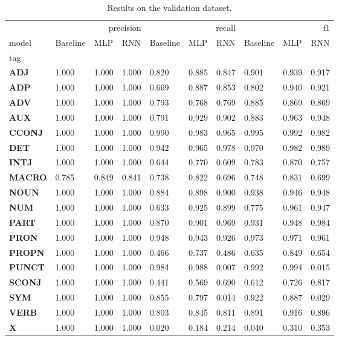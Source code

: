 \begin{table}
\caption{Results on the validation dataset.}
\label{tab::ex_2_valid}
\begin{tabular}{|l||l||l||l||l||l||l||l||l||l|}
\toprule
 & \multicolumn{3}{r}{precision} & \multicolumn{3}{r}{recall} & \multicolumn{3}{r}{f1} \\
model & Baseline & MLP & RNN & Baseline & MLP & RNN & Baseline & MLP & RNN \\
tag &  &  &  &  &  &  &  &  &  \\
\midrule
\textbf{ADJ} & 1.000 & 1.000 & 1.000 & 0.820 & 0.885 & 0.847 & 0.901 & 0.939 & 0.917 \\
\textbf{ADP} & 1.000 & 1.000 & 1.000 & 0.669 & 0.887 & 0.853 & 0.802 & 0.940 & 0.921 \\
\textbf{ADV} & 1.000 & 1.000 & 1.000 & 0.793 & 0.768 & 0.769 & 0.885 & 0.869 & 0.869 \\
\textbf{AUX} & 1.000 & 1.000 & 1.000 & 0.791 & 0.929 & 0.902 & 0.883 & 0.963 & 0.948 \\
\textbf{CCONJ} & 1.000 & 1.000 & 1.000 & 0.990 & 0.983 & 0.965 & 0.995 & 0.992 & 0.982 \\
\textbf{DET} & 1.000 & 1.000 & 1.000 & 0.942 & 0.965 & 0.978 & 0.970 & 0.982 & 0.989 \\
\textbf{INTJ} & 1.000 & 1.000 & 1.000 & 0.644 & 0.770 & 0.609 & 0.783 & 0.870 & 0.757 \\
\textbf{MACRO} & 0.785 & 0.849 & 0.841 & 0.738 & 0.822 & 0.696 & 0.748 & 0.831 & 0.699 \\
\textbf{NOUN} & 1.000 & 1.000 & 1.000 & 0.884 & 0.898 & 0.900 & 0.938 & 0.946 & 0.948 \\
\textbf{NUM} & 1.000 & 1.000 & 1.000 & 0.633 & 0.925 & 0.899 & 0.775 & 0.961 & 0.947 \\
\textbf{PART} & 1.000 & 1.000 & 1.000 & 0.870 & 0.901 & 0.969 & 0.931 & 0.948 & 0.984 \\
\textbf{PRON} & 1.000 & 1.000 & 1.000 & 0.948 & 0.943 & 0.926 & 0.973 & 0.971 & 0.961 \\
\textbf{PROPN} & 1.000 & 1.000 & 1.000 & 0.466 & 0.737 & 0.486 & 0.635 & 0.849 & 0.654 \\
\textbf{PUNCT} & 1.000 & 1.000 & 1.000 & 0.984 & 0.988 & 0.007 & 0.992 & 0.994 & 0.015 \\
\textbf{SCONJ} & 1.000 & 1.000 & 1.000 & 0.441 & 0.569 & 0.690 & 0.612 & 0.726 & 0.817 \\
\textbf{SYM} & 1.000 & 1.000 & 1.000 & 0.855 & 0.797 & 0.014 & 0.922 & 0.887 & 0.029 \\
\textbf{VERB} & 1.000 & 1.000 & 1.000 & 0.803 & 0.845 & 0.811 & 0.891 & 0.916 & 0.896 \\
\textbf{X} & 1.000 & 1.000 & 1.000 & 0.020 & 0.184 & 0.214 & 0.040 & 0.310 & 0.353 \\
\bottomrule
\end{tabular}
\end{table}
